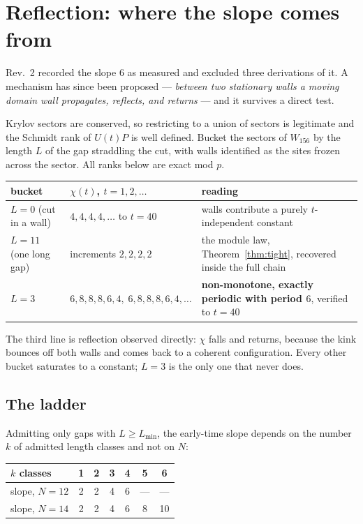 \documentclass[11pt]{article}
\theoremstyle{plain}
\theoremstyle{remark}
\begin{document}
\section{Reflection: where the slope comes from}
\label{sec:reflection}

Rev.\ 2 recorded the slope $6$ as measured and excluded three derivations of it.
A mechanism has since been proposed --- \emph{between two stationary walls a
moving domain wall propagates, reflects, and returns} --- and it survives a
direct test.

Krylov sectors are conserved, so restricting to a union of sectors is legitimate
and the Schmidt rank of $U(t)P$ is well defined. Bucket the sectors of $W_{156}$
by the length $L$ of the gap straddling the cut, with walls identified as the
sites frozen across the sector. All ranks below are exact mod $p$.

\begin{center}
\begin{tabular}{p{}p{}p{}}
\toprule
bucket & $\chi(t)$, $t=1,2,\dots$ & reading \\
\midrule
$L=0$ (cut in a wall) & $4,4,4,4,\dots$ to $t{=}40$ & walls contribute a purely
  $t$-independent constant \\
$L=11$ (one long gap) & increments $2,2,2,2$ & the module law,
  Theorem~\ref{thm:tight}, recovered inside the full chain \\
$L=3$ & $6,8,8,8,6,4,\;6,8,8,8,6,4,\dots$ & \textbf{non-monotone, exactly
  periodic with period $6$}, verified to $t{=}40$ \\
\bottomrule
\end{tabular}
\end{center}

\noindent The third line is reflection observed directly: $\chi$ falls and
returns, because the kink bounces off both walls and comes back to a coherent
configuration. Every other bucket saturates to a constant; $L=3$ is the only one
that never does.

\subsection{The ladder}

Admitting only gaps with $L\ge L_{\min}$, the early-time slope depends on the
number $k$ of admitted length classes and not on $N$:

\begin{center}
\begin{tabular}{lcccccc}
\toprule
$k$ classes & 1 & 2 & 3 & 4 & 5 & 6 \\
\midrule
slope, $N=12$ & 2 & 2 & 4 & 6 & --- & --- \\
slope, $N=14$ & 2 & 2 & 4 & 6 & 8 & 10 \\
\bottomrule
\end{tabular}
\end{center}
\end{document}
